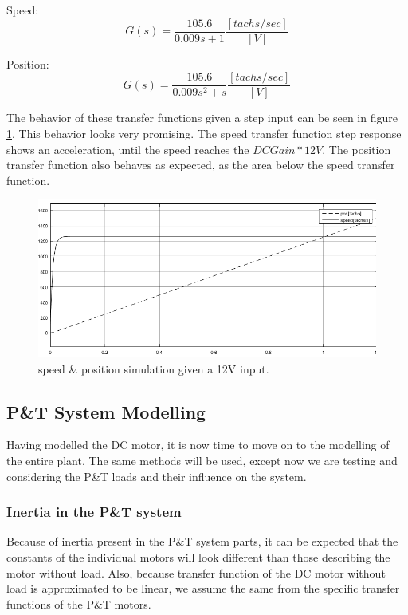Speed:
\begin{equation}
G(s)=\frac{105.6}{0.009s+1} \frac{[tachs/sec]}{[V]}
\end{equation}

Position:
\begin{equation}
G(s)=\frac{105.6}{0.009s^2+s} \frac{[tachs/sec]}{[V]}
\label{eq:PosTF}
\end{equation}

The behavior of these transfer functions given a step input can be seen in figure \ref{fig:SpeedPosSim12V}. This behavior looks very promising. The speed transfer function step response shows an acceleration, until the speed reaches the $DC Gain * 12V$. The position transfer function also behaves as expected, as the area below the speed transfer function. 

\begin{figure}[h!]
\centering
\includegraphics[scale=0.6]{Billeder/SpeedPosSim12V.png}
\caption{speed \& position simulation given a 12V input.}
\label{fig:SpeedPosSim12V}
\end{figure}

\subsection{P\&T System Modelling}
Having modelled the DC motor, it is now time to move on to the modelling of the entire plant. The same methods will be used, except now we are testing and considering the P\&T loads and their influence on the system.

\subsubsection{Inertia in the P\&T system}
Because of inertia present in the P\&T system parts, it can be expected that the constants of the individual motors will look different than those describing the motor without load. Also, because transfer function of the DC motor without load is approximated to be linear, we assume the same from the specific transfer functions of the P\&T motors.

